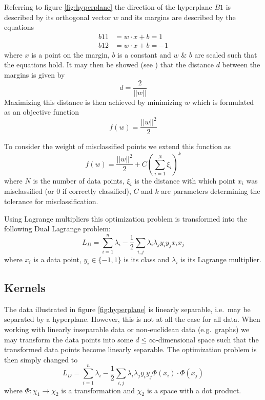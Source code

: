 \documentclass{article}
\begin{document}
Referring to figure \ref{fig:hyperplane} the direction of the hyperplane $B1$ is described by its orthogonal vector $w$ and its margins are described by the equations
\begin{align}
b11 &= w\cdot x + b = 1\\
b12 &= w \cdot x + b = -1
\end{align}
where $x$ is a point on the margin, $b$ is a constant and $w$ \& $b$ are scaled such that the equations hold. It may then be showed (see \cite{svm-graph-kernels}) that the distance $d$ between the margins is given by
\begin{equation}
d = \frac{2}{||w||}
\end{equation}
Maximizing this distance is then achieved by minimizing $w$ which is formulated as an objective function
\begin{equation}
f(w) = \frac{||w||^2}{2}
\end{equation}

To consider the weight of misclassified points we extend this function as
\begin{equation}
f(w) = \frac{||w||^2}{2} + C\left(\sum_{i=1}^{N}\xi_i\right)^k
\end{equation}
where $N$ is the number of data points, $\xi_i$ is the distance with which point $x_i$ was misclassified (or 0 if correctly classified), $C$ and $k$ are parameters determining the tolerance for misclassification.

Using Lagrange multipliers this optimization problem is transformed into the following Dual Lagrange problem:
\begin{equation}
\label{eq:dual_lagrange_problem}
L_D = \sum_{i=1}^{n}\lambda_i-\frac{1}{2}\sum_{i,j}\lambda_i\lambda_j y_iy_j x_ix_j
\end{equation}
where $x_i$ is a data point, $y_i\in \{-1, 1\}$ is its class and $\lambda_i$ is its Lagrange multiplier.

\subsection{Kernels}
The data illustrated in figure \ref{fig:hyperplane} is linearly separable, i.e.\ may be separated by a hyperplane. However, this is not at all the case for all data. When working with linearly inseparable data or non-euclidean data (e.g.\ graphs) we may transform the data points into some $d\leq\infty$-dimensional space such that the transformed data points become linearly separable. The optimization problem is then simply changed to
\begin{equation}
\label{eq:kernel_function_phi}
L_D = \sum_{i=1}^{n}\lambda_i-\frac{1}{2}\sum_{i,j}\lambda_i\lambda_j y_iy_j\Phi(x_i)\cdot\Phi(x_j)
\end{equation}
where $\Phi:\chi_1\rightarrow\chi_2$ is a transformation and $\chi_2$ is a space with a dot product.
\end{document}

